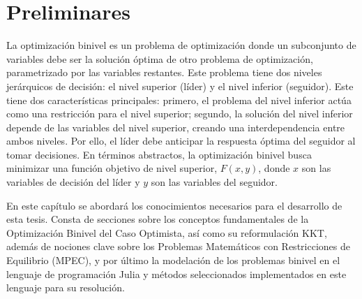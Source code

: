 \chapter{Preliminares}


La optimización binivel es un problema de optimización donde un subconjunto de variables debe ser la solución óptima de otro problema de optimización, parametrizado por las variables restantes. Este problema tiene dos niveles jerárquicos de decisión: el nivel superior (líder) y el nivel inferior (seguidor).
Este tiene dos características principales: primero, el problema del nivel inferior actúa como una restricción para el nivel superior; segundo, la solución del nivel inferior depende de las variables del nivel superior, creando una interdependencia entre ambos niveles. Por ello, el líder debe anticipar la respuesta óptima del seguidor al tomar decisiones.
En términos abstractos, la optimización binivel busca minimizar una función objetivo de nivel superior, $F(x, y)$, donde $x$ son las variables de decisión del líder y $y$ son las variables del seguidor. 

En este capítulo se abordará los conocimientos necesarios para el desarrollo de esta tesis. Consta de secciones sobre los conceptos fundamentales de la Optimización Binivel del Caso Optimista, así como su reformulación KKT,
además de nociones clave sobre los Problemas Matemáticos con Restricciones de Equilibrio (MPEC), 
y por último la modelación de los problemas binivel en el lenguaje de programación Julia y métodos seleccionados implementados en este lenguaje para su resolución. 

